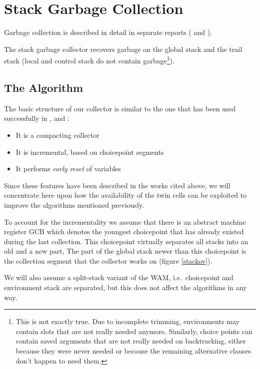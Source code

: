 \section{Stack Garbage Collection}

Garbage collection is described in detail in separate reports
(\cite{gc90} and \cite{gcint90}).

The stack garbage collector recovers garbage on the global stack
and the trail stack (local and control stack do not contain
garbage\footnote{
This is not exactly true. Due to incomplete trimming, environments
may contain slots that are not really needed anymore. Similarly,
choice points can contain saved arguments that are not really needed
on backtracking, either because they were never needed or because
the remaining alternative clauses don't happen to need them.}).

\subsection{The Algorithm}
The basic structure of our collector is similar to the one that has been
used successfully in \cite{pitt}, \cite{achs} and \cite{bark87}:
\begin{itemize}
\item It is a compacting collector
\item It is incremental, based on choicepoint segments
\item It performs {\em early reset} of variables
\end{itemize}

Since these features have been described in the works cited above,
we will concentrate here upon how the availability of the twin cells
can be exploited to improve the algorithms mentioned previously.

To account for the incrementality we assume that there
is an abstract machine register GCB which denotes the youngest
choicepoint that has already existed during the last collection.
This choicepoint virtually separates all stacks into an old and a new part,
The part of the global stack newer than this choicepoint
is the collection segment that the collector works on (figure
\ref{stackov}).

We will also assume a split-stack variant of the WAM,
i.e.\ choicepoint and environment stack are separated, but this
does not affect the algorithms in any way.

